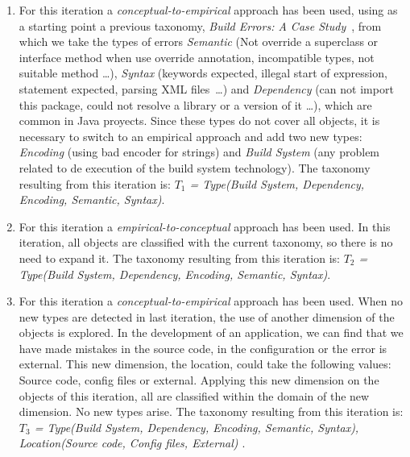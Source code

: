 \begin{enumerate}
	
	\item For this iteration a \textit{conceptual-to-empirical} approach has been used, using as a starting point a previous taxonomy, \textit{Build Errors: A Case Study}~\cite{Seo:2014:PBE:2568225.2568255}, from which we take the types of errors \textit{Semantic} (Not override a superclass or interface method when use override annotation, incompatible types, not suitable method \dots), \textit{Syntax} (keywords expected, illegal start of expression, statement expected, parsing XML files~\dots) and \textit{Dependency} (can not import this package, could not resolve a library or a version of it \dots), which are common in Java proyects. Since these types do not cover all objects, it is necessary to switch to an empirical approach and add two new types: \textit{Encoding} (using bad encoder for strings) and \textit{Build System} (any problem related to de execution of the build system technology). The taxonomy resulting from this iteration is: \textit{$T_{1}$ = {Type(Build System, Dependency, Encoding, Semantic, Syntax)}}.
	
	\vspace{2mm}
	\item For this iteration a \textit{empirical-to-conceptual} approach has been used. In this iteration, all objects are classified with the current taxonomy, so there is no need to expand it. The taxonomy resulting from this iteration is: \textit{$T_{2}$ = {Type(Build System, Dependency, Encoding, Semantic, Syntax)}}.
	
	\vspace{2mm}
	\item For this iteration a \textit{conceptual-to-empirical} approach has been used. When no new types are detected in last iteration, the use of another dimension of the objects is explored. In the development of an application, we can find that we have made mistakes in the source code, in the configuration or the error is external. This new dimension, the location, could take the following values: Source code, config files or external. Applying this new dimension on the objects of this iteration, all are classified within the domain of the new dimension. No new types arise. The taxonomy resulting from this iteration is: \textit{$T_{3}$ = {Type(Build System, Dependency, Encoding, Semantic, Syntax), Location(Source code, Config files, External) }}.
	

\end{enumerate}
